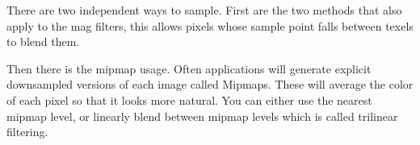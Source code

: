 \documentclass{article}
\begin{document}
\begin{enumerate}
\begin{mdframed}
                There are two independent ways to sample.
                First are the two methods that also apply to the mag filters,
                this allows pixels whose sample point falls between texels to blend them.

                Then there is the mipmap usage. Often applications will generate explicit downsampled
                versions of each image called Mipmaps. These will average the color of each
                pixel so that it looks more natural. You can either use the nearest mipmap level,
                or linearly blend between mipmap levels which is called trilinear filtering.
            \end{mdframed}
    \end{enumerate}
\end{document}
